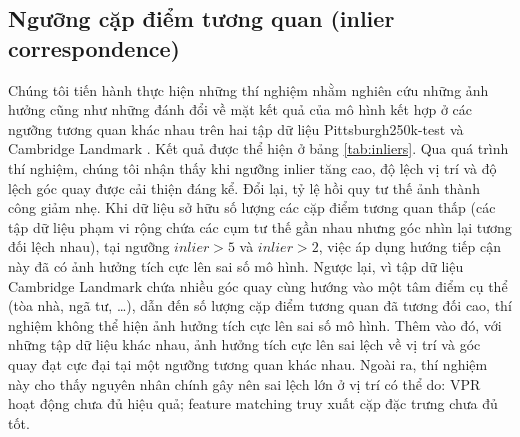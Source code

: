 \subsection{Ngưỡng cặp điểm tương quan (inlier correspondence)}
Chúng tôi tiến hành thực hiện những thí nghiệm nhằm nghiên cứu những ảnh hưởng cũng như những đánh đổi về mặt kết quả của mô hình kết hợp ở các ngưỡng tương quan khác nhau trên hai tập dữ liệu Pittsburgh250k-test \cite{6618963} và Cambridge Landmark \cite{kendall2016posenet}. Kết quả được thể hiện ở bảng \ref{tab:inliers}. Qua quá trình thí nghiệm, chúng tôi nhận thấy khi ngưỡng inlier tăng cao, độ lệch vị trí và độ lệch góc quay được cải thiện đáng kể. Đổi lại, tỷ lệ hồi quy tư thế ảnh thành công giảm nhẹ. Khi dữ liệu sở hữu số lượng các cặp điểm tương quan thấp (các tập dữ liệu phạm vi rộng chứa các cụm tư thế gần nhau nhưng góc nhìn lại tương đối lệch nhau), tại ngưỡng $inlier > 5$ và $inlier > 2$, việc áp dụng hướng tiếp cận này đã có ảnh hưởng tích cực lên sai số mô hình. Ngược lại, vì tập dữ liệu Cambridge Landmark chứa nhiều góc quay cùng hướng vào một tâm điểm cụ thể (tòa nhà, ngã tư, \dots), dẫn đến số lượng cặp điểm tương quan đã tương đối cao, thí nghiệm không thể hiện ảnh hưởng tích cực lên sai số mô hình. Thêm vào đó, với những tập dữ liệu khác nhau, ảnh hưởng tích cực lên sai lệch về vị trí và góc quay đạt cực đại tại một ngưỡng tương quan khác nhau. Ngoài ra, thí nghiệm này cho thấy nguyên nhân chính gây nên sai lệch lớn ở vị trí có thể do: VPR hoạt động chưa đủ hiệu quả; feature matching truy xuất cặp đặc trưng chưa đủ tốt.

